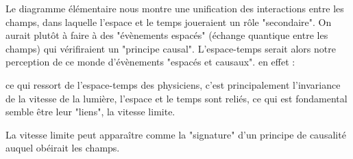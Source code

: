 Le diagramme élémentaire nous montre une unification des interactions entre les champs, dans laquelle l'espace et le temps joueraient un rôle "secondaire". On aurait plutôt à faire à des "évènements espacés" (échange quantique entre les champs) qui vérifiraient un "principe causal". L'espace-temps serait alors notre perception de ce monde d'évènements "espacés et causaux". en effet :

ce qui ressort de l'espace-temps des physiciens, c'est principalement l'invariance de la vitesse de la lumière, l'espace et le temps sont reliés, ce qui est fondamental semble être leur "liens", la vitesse limite.

La vitesse limite peut apparaître comme la "signature" d'un principe de causalité auquel obéirait les champs.
